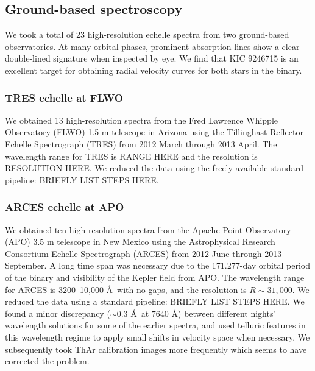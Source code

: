 \subsection{Ground-based spectroscopy}\label{spectra}
We took a total of 23 high-resolution echelle spectra from two ground-based observatories. At many orbital phases, prominent absorption lines show a clear double-lined signature when inspected by eye. We find that KIC 9246715 is an excellent target for obtaining radial velocity curves for both stars in the binary.

	\subsubsection{TRES echelle at FLWO}\label{tres}
We obtained 13 high-resolution spectra from the Fred Lawrence Whipple Observatory (FLWO) 1.5 m telescope in Arizona using the Tillinghast Reflector Echelle Spectrograph (TRES) from 2012 March through 2013 April. The wavelength range for TRES is RANGE HERE and the resolution is RESOLUTION HERE. We reduced the data using the freely available standard pipeline: BRIEFLY LIST STEPS HERE.

	\subsubsection{ARCES echelle at APO}\label{arces}
We obtained ten high-resolution spectra from the Apache Point Observatory (APO) 3.5 m telescope in New Mexico using the Astrophysical Research Consortium Echelle Spectrograph (ARCES) from 2012 June through 2013 September. A long time span was necessary due to the 171.277-day orbital period of the binary and visibility of the Kepler field from APO. The wavelength range for ARCES is 3200--10,000 \AA \ with no gaps, and the resolution is $R \sim 31,000$. We reduced the data using a standard pipeline: BRIEFLY LIST STEPS HERE. We found a minor discrepancy ($\sim 0.3$ \AA \ at $7640$ \AA) between different nights' wavelength solutions for some of the earlier spectra, and used telluric features in this wavelength regime to apply small shifts in velocity space when necessary. We subsequently took ThAr calibration images more frequently which seems to have corrected the problem.
